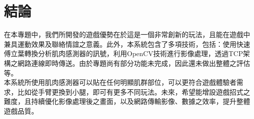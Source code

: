 \documentclass[12pt]{article}  %
\theoremstyle{plain}
\begin{document}




\newpage

\section{結論}
在本專題中，我們所開發的遊戲優勢在於這是一個非常創新的玩法，且能在遊戲中兼具運動效果及聯絡情誼之意義。此外，本系統包含了多項技術，包括：使用快速傅立葉轉換分析肌肉感測器的訊號，利用OpenCV技術進行影像處理，透過TCP架構之網路連線即時傳送。由於專題尚有部分功能未完成，因此還未做出整體之評估等。\\
\indent 本系統所使用肌肉感測器可以貼在任何明顯肌群部位，可以更符合遊戲體驗者需求，比如從手臂更換到小腿，即可有更多不同玩法。未來，希望能增設遊戲招式之難度，且持續優化影像處理後之畫面，以及網路傳輸影像、數據之效率，提升整體遊戲品質。\\
\newpage
\end{document}
